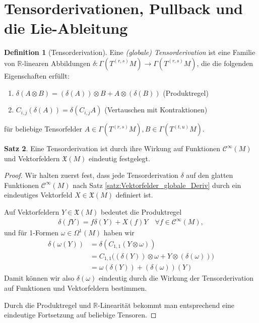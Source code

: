 \documentclass[a4paper]{scrbook}
\numberwithin{equation}{chapter}
\newcommand{\R}{\mathbb{R}}
\newcommand{\sC}{\mathcal{C}^{\infty}}
\newcommand{\vf}{\mathfrak{X}}
\theoremstyle{definition}
\newtheorem{defn}{Definition}[section]
\newtheorem{satz}[defn]{Satz}
\begin{document}
	\section{Tensorderivationen, Pullback und die Lie-Ableitung}
		\begin{defn}[Tensorderivation]
			Eine \emph{(globale) Tensorderivation} ist eine Familie von $\R$-linearen Abbildungen $\delta\colon\Gamma(T^{(r,s)}M)\rightarrow \Gamma(T^{(r,s)}M)$, die die folgenden Eigenschaften erfüllt:
			\begin{enumerate}[label=(\roman*)]
				\item $\delta (A\otimes B)=(\delta(A))\otimes B+A\otimes(\delta(B))$ (Produktregel)
				\item $C_{i,j}(\delta(A))=\delta(C_{i,j}A)$ (Vertauschen mit Kontraktionen)
			\end{enumerate}
			für beliebige Tensorfelder $A\in \Gamma(T^{(r,s)}M), B\in\Gamma(T^{(t,u)}M)$.
		\end{defn}
		
		\begin{satz}\label{satz:Fortsetzung_Derivationen}
			Eine Tensorderivation ist durch ihre Wirkung auf Funktionen $\sC(M)$ und Vektorfeldern $\vf(M)$ eindeutig festgelegt.
			\begin{proof}
				Wir halten zuerst fest, dass jede Tensorderivation $\delta$ auf den glatten Funktionen $\sC(M)$ nach Satz \ref{satz:Vektorfelder_globale_Deriv} durch ein eindeutiges Vektorfeld $X\in\vf(M)$ definiert ist.
				
				Auf Vektorfeldern $Y\in\vf(M)$ bedeutet die Produktregel
				\begin{align*}
					\delta(fY)=f\delta(Y)+X(f)Y \quad\forall f\in\sC(M),
				\end{align*}
				und für 1-Formen $\omega\in\Omega^1(M)$ haben wir
				\begin{align*}
					\delta(\omega(Y)) &= \delta(C_{1,1}(Y\otimes\omega))\\
					&= C_{1,1}\Big( (\delta(Y))\otimes\omega + Y\otimes(\delta(\omega)) \Big)\\
					&= \omega(\delta(Y)) + (\delta(\omega))(Y)
				\end{align*}
				Damit können wir also $\delta(\omega)$ eindeutig durch die Wirkung der Tensorderivation auf Funktionen und Vektorfeldern bestimmen.
				
				Durch die Produktregel und $\R$-Linearität bekommt man entsprechend eine eindeutige Fortsetzung auf beliebige Tensoren.
			\end{proof}
		\end{satz}
		
\end{document}
